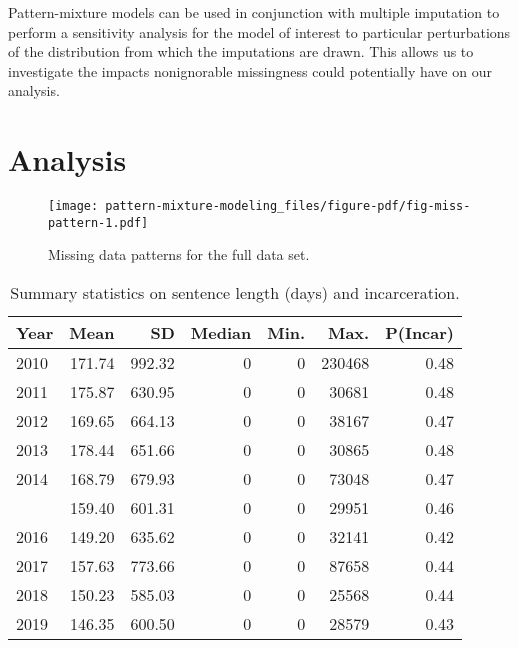 \documentclass[
  letterpaper,
  DIV=11,
  numbers=noendperiod]{scrartcl}
\begin{document}
Pattern-mixture models can be used in conjunction with multiple
imputation to perform a sensitivity analysis for the model of interest
to particular perturbations of the distribution from which the
imputations are drawn. This allows us to investigate the impacts
nonignorable missingness could potentially have on our analysis.

\hypertarget{analysis}{%
\section{Analysis}\label{analysis}}

\begin{figure}

{\centering \texttt{[image: pattern-mixture-modeling\_files/figure-pdf/fig-miss-pattern-1.pdf]}

}

\caption{\label{fig-miss-pattern}Missing data patterns for the full data
set.}

\end{figure}

\hypertarget{tbl-yearly-summary}{}
\begin{table}
\caption{\label{tbl-yearly-summary}Summary statistics on sentence length (days) and incarceration. }\tabularnewline

\centering
\begin{tabular}{lrrrrrr}
\toprule
Year & Mean & SD & Median & Min. & Max. & P(Incar)\\
\midrule
2010 & 171.74 & 992.32 & 0 & 0 & 230468 & 0.48\\
2011 & 175.87 & 630.95 & 0 & 0 & 30681 & 0.48\\
2012 & 169.65 & 664.13 & 0 & 0 & 38167 & 0.47\\
2013 & 178.44 & 651.66 & 0 & 0 & 30865 & 0.48\\
2014 & 168.79 & 679.93 & 0 & 0 & 73048 & 0.47\\
\addlinespace
2015 & 159.40 & 601.31 & 0 & 0 & 29951 & 0.46\\
2016 & 149.20 & 635.62 & 0 & 0 & 32141 & 0.42\\
2017 & 157.63 & 773.66 & 0 & 0 & 87658 & 0.44\\
2018 & 150.23 & 585.03 & 0 & 0 & 25568 & 0.44\\
2019 & 146.35 & 600.50 & 0 & 0 & 28579 & 0.43\\
\bottomrule
\end{tabular}
\end{table}
\end{document}
